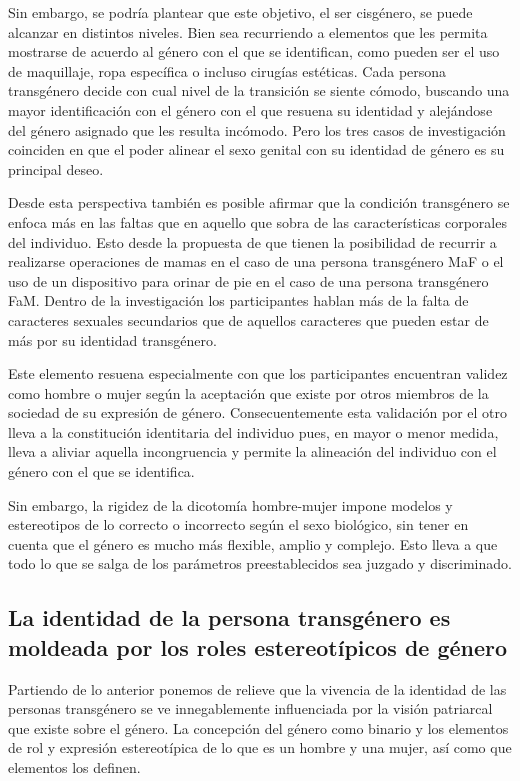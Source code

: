 Sin embargo, se podría plantear que este objetivo, el ser cisgénero, se puede
alcanzar en distintos niveles. Bien sea recurriendo a elementos que les permita
mostrarse de acuerdo al género con el que se identifican, como pueden ser el uso
de maquillaje, ropa específica o incluso cirugías estéticas. Cada persona
transgénero decide con cual nivel de la transición se siente cómodo, buscando
una mayor identificación con el género con el que resuena su identidad y
alejándose del género  asignado que les resulta incómodo. Pero los tres casos de
investigación coinciden en que el poder alinear el sexo genital con su identidad
de género es su principal deseo.

Desde esta perspectiva también es posible afirmar que la condición transgénero
se enfoca más en las faltas que en aquello que sobra de las características
corporales del individuo. Esto desde la propuesta de que tienen la posibilidad
de recurrir a realizarse operaciones de mamas en el caso de una persona
transgénero MaF o el uso de un dispositivo para orinar de pie en el caso de una
persona transgénero FaM. Dentro de la investigación los participantes hablan más
de la falta de caracteres sexuales secundarios que de aquellos caracteres que
pueden estar de más por su identidad transgénero.

Este elemento resuena especialmente con que los
participantes encuentran validez como hombre o mujer según la aceptación
que existe por otros miembros de la sociedad de su expresión de género.
Consecuentemente esta validación por el otro lleva a la constitución
identitaria del individuo pues, en mayor o menor medida, lleva a aliviar
aquella incongruencia y permite la alineación del individuo con el género con el
que se identifica.

Sin embargo, la rigidez de la dicotomía hombre-mujer impone modelos y
estereotipos de lo correcto o incorrecto según el sexo biológico, sin tener en
cuenta que el género es mucho más flexible, amplio y complejo. Esto lleva a que
todo lo que se salga de los parámetros preestablecidos sea juzgado y
discriminado.

\subsection[La identidad es moldeada por el patriarcado]{La identidad de la persona
transgénero es moldeada por los roles estereotípicos de género}

Partiendo de lo anterior ponemos de relieve que la vivencia de la identidad de
las personas transgénero se ve innegablemente influenciada por la visión
patriarcal que existe sobre el género. La concepción del género como binario y
los elementos de rol y expresión estereotípica de lo que es un hombre y una
mujer, así como que elementos los definen.

